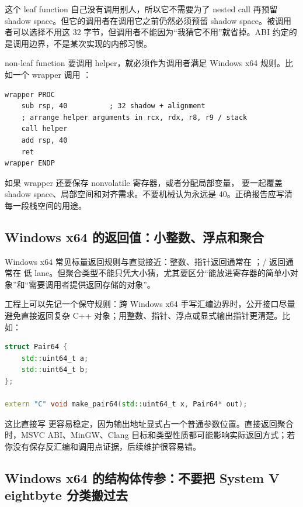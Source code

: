 这个 leaf function 自己没有调用别人，所以它不需要为了 nested call 再预留 shadow space。但它的调用者在调用它之前仍然必须预留 shadow space。被调用者可以选择不用这 32 字节，但调用者不能因为“我猜它不用”就省掉。ABI 约定的是调用边界，不是某次实现的内部习惯。

non-leaf function 要调用 helper，就必须作为调用者满足 Windows x64 规则。比如一个 wrapper 调用 ：

\begin{lstlisting}[numbers=none,caption={Windows x64 non-leaf 调用形态}]
wrapper PROC
    sub rsp, 40          ; 32 shadow + alignment
    ; arrange helper arguments in rcx, rdx, r8, r9 / stack
    call helper
    add rsp, 40
    ret
wrapper ENDP
\end{lstlisting}

如果 wrapper 还要保存 nonvolatile 寄存器，或者分配局部变量， 要一起覆盖 shadow space、局部空间和对齐需求。不要机械认为永远是 40。正确报告应写清每一段栈空间的用途。

\subsection{Windows x64 的返回值：小整数、浮点和聚合}

Windows x64 常见标量返回规则与直觉接近：整数、指针返回通常在 ；/ 返回通常在  低 lane。但聚合类型不能只凭大小猜，尤其要区分“能放进寄存器的简单小对象”和“需要调用者提供返回存储的对象”。

工程上可以先记一个保守规则：跨 Windows x64 手写汇编边界时，公开接口尽量避免直接返回复杂 C++ 对象；用整数、指针、浮点或显式输出指针更清楚。比如：

\begin{lstlisting}[language=C++]
struct Pair64 {
    std::uint64_t a;
    std::uint64_t b;
};

extern "C" void make_pair64(std::uint64_t x, Pair64* out);
\end{lstlisting}

这比直接写  更容易稳定，因为输出地址显式占一个普通参数位置。直接返回聚合时，MSVC ABI、MinGW、Clang 目标和类型性质都可能影响实际返回方式；若你没有保存反汇编和调用点证据，后续维护很容易错。

\subsection{Windows x64 的结构体传参：不要把 System V eightbyte 分类搬过去}

